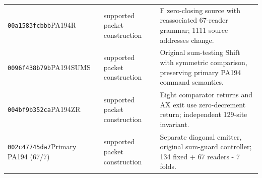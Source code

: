 {\begin{longtable}{@{}>{\raggedright\arraybackslash}p{}>{\raggedright\arraybackslash}p{}>{\raggedright\arraybackslash}p{}@{}}
\texttt{00a1583fcbbb}\newline PA194R & supported packet construction & F zero-closing source with reassociated 67-reader grammar; 1111 source addresses change.\\
\texttt{0096f438b79b}\newline PA194SUMS & supported packet construction & Original sum-testing Shift with symmetric comparison, preserving primary PA194 command semantics.\\
\texttt{004bf9b352ca}\newline PA194ZR & supported packet construction & Eight comparator returns and AX exit use zero-decrement return; independent 129-site invariant.\\
\texttt{002c47745da7}\newline Primary PA194 (67/7) & supported packet construction & Separate diagonal emitter, original sum-guard controller; 134 fixed + 67 readers - 7 folds.\\
\bottomrule\end{longtable}}
